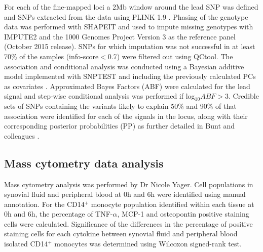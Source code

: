 
For each of the fine-mapped loci a 2Mb window around the lead SNP was defined and SNPs extracted from the data using PLINK 1.9 \parencite{Chang2015}. Phasing of the genotype data was performed with SHAPEIT \parencite{Delaneau2012} and used to impute missing genotypes with IMPUTE2 \parencite{Howie2009} and the 1000 Genomes Project Version 3 as the reference panel (October 2015 release). SNPs for which imputation was not successful in at least 70\% of the samples (info-score$<$0.7) were filtered out using QCtool. The association and conditional analysis was conducted using a Bayesian additive model implemented with SNPTEST and including the previously calculated PCs as covariates \parencite{Burton2007}. Approximated Bayes Factors (ABF) were calculated for the lead signal and step-wise conditional analysis was performed if log$_{10}ABF>$3. Credible sets of SNPs containing the variants likely to explain 50\% and 90\% of that association were identified for each of the signals in the locus, along with their corresponding posterior probabilities (PP) as further detailed in Bunt and colleagues \parencite{Bunt2015}.



\subsection{Mass cytometry data analysis}
Mass cytometry analysis was performed by Dr Nicole Yager. Cell populations in synovial fluid and peripheral blood at 0h and 6h were identified using manual annotation. For the CD14$^+$ monocyte population identified within each tissue at 0h and 6h, the percentage of TNF-$\alpha$, MCP-1 and osteopontin positive staining cells were calculated. Significance of the differences in the percentage of positive staining cells for each cytokine between synovial fluid and peripheral blood isolated CD14$^+$ monocytes was determined using Wilcoxon signed-rank test.  


